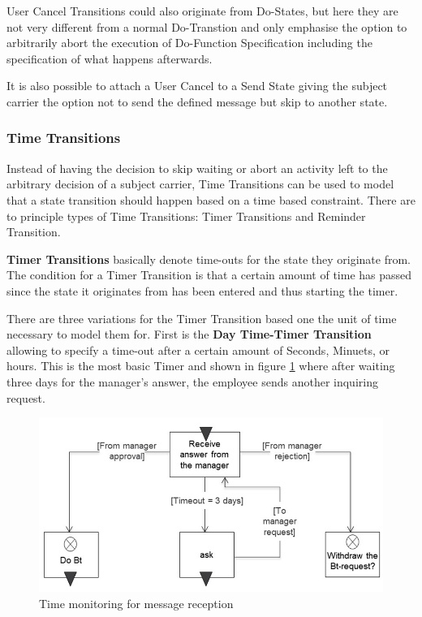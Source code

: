 User Cancel Transitions could also originate from Do-States, but here they are not very different from a normal Do-Transtion and only emphasise the option to arbitrarily abort the execution of Do-Function Specification including the specification of what happens afterwards. 

It is also possible to attach a User Cancel to a Send State giving the subject carrier the option not to send the defined message but skip to another state. 

\subsubsection{Time Transitions}

Instead of having the decision to skip waiting or abort an activity left to the arbitrary decision of a subject carrier, Time Transitions can be used to model that a state transition should happen based on a time based constraint. 
There are to principle types of Time Transitions: Timer Transitions and Reminder Transition.

\textbf{Timer Transitions} basically denote time-outs for the state they originate from.  The condition for a Timer Transition is that a certain amount of time has passed since the state it originates from has been entered and thus starting the timer.

There are three variations for the Timer Transition based one the unit of time necessary to model them for. First is the \textbf{Day Time-Timer Transition} allowing to specify a time-out after a certain amount of Seconds, Minuets, or hours. This is the most basic Timer and shown in figure \ref{fig:receivestatetimer} where after waiting three days for the manager's answer, the employee sends another inquiring request.

\begin{figure}[htbp]
	\centering
	\includegraphics[width=0.7\linewidth]{Figures/Ontology/SubjectBehavior/ReceiveStateTimer}
	\caption[Time monitoring for message reception]{Time monitoring for message reception}
	\label{fig:receivestatetimer}
\end{figure}

